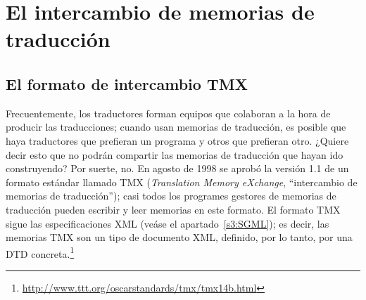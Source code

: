 \section{El intercambio de memorias de traducción} 

\subsection{El formato de intercambio TMX} 

Frecuentemente, los traductores forman equipos que colaboran a la hora de producir las traducciones; cuando usan memorias de traducción, es posible que haya traductores que prefieran un programa y otros que prefieran otro. ¿Quiere decir esto que no podrán compartir las memorias de traducción que hayan ido construyendo? Por suerte, no. En agosto de 1998 se aprobó la versión 1.1 de un formato estándar llamado TMX (\emph{Translation Memory eXchange}, ``intercambio de memorias de traducción''); casi todos los programes gestores de memorias de traducción pueden escribir y leer memorias en este formato. El formato TMX sigue las especificaciones XML (veáse el apartado~\ref{s3:SGML}); es decir, las memorias TMX son un tipo de documento XML, definido, por lo tanto, por una DTD concreta.\footnote{\url{http://www.ttt.org/oscarstandards/tmx/tmx14b.html}} 

